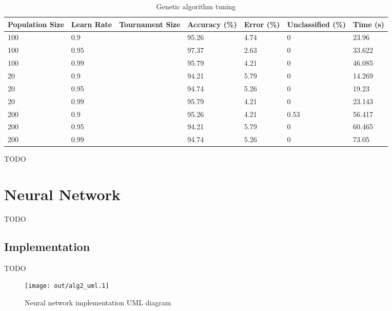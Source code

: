 \documentclass[a4paper]{article}
\begin{document}
\begin{table}[h!]
  \centering
  \begin{tabular}{@{}lllllll@{}}
    \toprule
    Population Size & Learn Rate & Tournament Size & Accuracy (\%) & Error (\%) & Unclassified (\%) & Time (s) \\
    \midrule
    100             & 0.9        &                 & 95.26         & 4.74       & 0                 & 23.96    \\
    100             & 0.95       &                 & 97.37         & 2.63       & 0                 & 33.622   \\
    100             & 0.99       &                 & 95.79         & 4.21       & 0                 & 46.085   \\
    20              & 0.9        &                 & 94.21         & 5.79       & 0                 & 14.269   \\
    20              & 0.95       &                 & 94.74         & 5.26       & 0                 & 19.23    \\
    20              & 0.99       &                 & 95.79         & 4.21       & 0                 & 23.143   \\
    200             & 0.9        &                 & 95.26         & 4.21       & 0.53              & 56.417   \\
    200             & 0.95       &                 & 94.21         & 5.79       & 0                 & 60.465   \\
    200             & 0.99       &                 & 94.74         & 5.26       & 0                 & 73.05    \\
    \bottomrule
  \end{tabular}
  \caption{Genetic algorithm tuning}
  \label{tab:ga_tuning}
\end{table}

TODO

\section{Neural Network}

TODO

\subsection{Implementation}

TODO

\begin{figure}[h!]
  \centering
  \texttt{[image: out/alg2\_uml.1]}
  \caption{Neural network implementation UML diagram}
  \label{fig:alg2_uml}
\end{figure}
\end{document}
